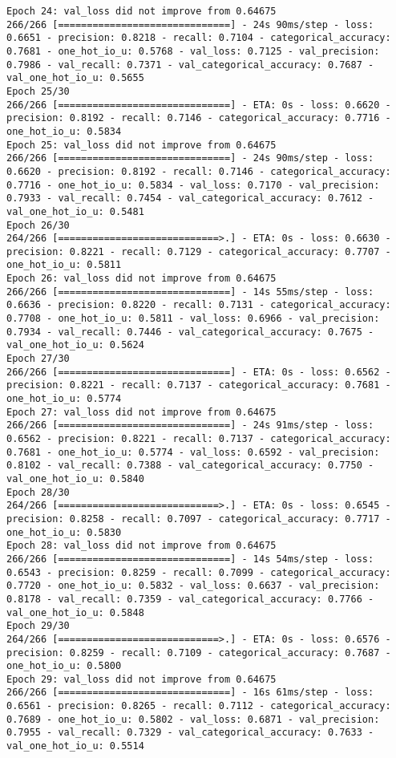 \documentclass[
  letterpaper,
  DIV=11,
  numbers=noendperiod]{scrreprt}
\begin{document}
\begin{verbatim}
Epoch 24: val_loss did not improve from 0.64675
266/266 [==============================] - 24s 90ms/step - loss: 0.6651 - precision: 0.8218 - recall: 0.7104 - categorical_accuracy: 0.7681 - one_hot_io_u: 0.5768 - val_loss: 0.7125 - val_precision: 0.7986 - val_recall: 0.7371 - val_categorical_accuracy: 0.7687 - val_one_hot_io_u: 0.5655
Epoch 25/30
266/266 [==============================] - ETA: 0s - loss: 0.6620 - precision: 0.8192 - recall: 0.7146 - categorical_accuracy: 0.7716 - one_hot_io_u: 0.5834
Epoch 25: val_loss did not improve from 0.64675
266/266 [==============================] - 24s 90ms/step - loss: 0.6620 - precision: 0.8192 - recall: 0.7146 - categorical_accuracy: 0.7716 - one_hot_io_u: 0.5834 - val_loss: 0.7170 - val_precision: 0.7933 - val_recall: 0.7454 - val_categorical_accuracy: 0.7612 - val_one_hot_io_u: 0.5481
Epoch 26/30
264/266 [============================>.] - ETA: 0s - loss: 0.6630 - precision: 0.8221 - recall: 0.7129 - categorical_accuracy: 0.7707 - one_hot_io_u: 0.5811
Epoch 26: val_loss did not improve from 0.64675
266/266 [==============================] - 14s 55ms/step - loss: 0.6636 - precision: 0.8220 - recall: 0.7131 - categorical_accuracy: 0.7708 - one_hot_io_u: 0.5811 - val_loss: 0.6966 - val_precision: 0.7934 - val_recall: 0.7446 - val_categorical_accuracy: 0.7675 - val_one_hot_io_u: 0.5624
Epoch 27/30
266/266 [==============================] - ETA: 0s - loss: 0.6562 - precision: 0.8221 - recall: 0.7137 - categorical_accuracy: 0.7681 - one_hot_io_u: 0.5774
Epoch 27: val_loss did not improve from 0.64675
266/266 [==============================] - 24s 91ms/step - loss: 0.6562 - precision: 0.8221 - recall: 0.7137 - categorical_accuracy: 0.7681 - one_hot_io_u: 0.5774 - val_loss: 0.6592 - val_precision: 0.8102 - val_recall: 0.7388 - val_categorical_accuracy: 0.7750 - val_one_hot_io_u: 0.5840
Epoch 28/30
264/266 [============================>.] - ETA: 0s - loss: 0.6545 - precision: 0.8258 - recall: 0.7097 - categorical_accuracy: 0.7717 - one_hot_io_u: 0.5830
Epoch 28: val_loss did not improve from 0.64675
266/266 [==============================] - 14s 54ms/step - loss: 0.6543 - precision: 0.8259 - recall: 0.7099 - categorical_accuracy: 0.7720 - one_hot_io_u: 0.5832 - val_loss: 0.6637 - val_precision: 0.8178 - val_recall: 0.7359 - val_categorical_accuracy: 0.7766 - val_one_hot_io_u: 0.5848
Epoch 29/30
264/266 [============================>.] - ETA: 0s - loss: 0.6576 - precision: 0.8259 - recall: 0.7109 - categorical_accuracy: 0.7687 - one_hot_io_u: 0.5800
Epoch 29: val_loss did not improve from 0.64675
266/266 [==============================] - 16s 61ms/step - loss: 0.6561 - precision: 0.8265 - recall: 0.7112 - categorical_accuracy: 0.7689 - one_hot_io_u: 0.5802 - val_loss: 0.6871 - val_precision: 0.7955 - val_recall: 0.7329 - val_categorical_accuracy: 0.7633 - val_one_hot_io_u: 0.5514

\end{verbatim}
\end{document}
